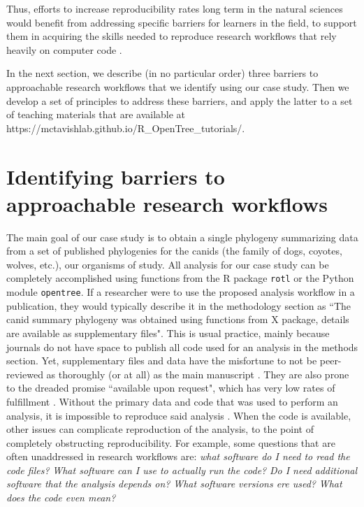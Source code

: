 \documentclass[12pt]{article}
\begin{document}
Thus, efforts to increase reproducibility rates long term in the natural sciences would benefit from addressing specific barriers for learners in the field, to support them in acquiring the skills needed to reproduce research workflows that rely heavily on computer code \citep{peng2011reproducible, sandve2013ten, powers2019open}.

In the next section, we describe (in no particular order) three barriers to approachable research workflows that we identify using our case study.
Then we develop a set of principles to address these barriers, and apply the latter to a set of teaching materials that are available at https://mctavishlab.github.io/R\_OpenTree\_tutorials/.


\section*{Identifying barriers to approachable research workflows}
\label{sec:identifying}


The main goal of our case study is to obtain a single phylogeny summarizing data from a set of published phylogenies for the canids (the family of dogs, coyotes, wolves, etc.), our organisms of study.
All analysis for our case study can be completely accomplished using functions from the R package \texttt{rotl} or the Python module \texttt{opentree}.
If a researcher were to use the proposed analysis workflow in a publication, they would typically describe it in the methodology section as ``The canid summary phylogeny was obtained using functions from X package, details are available as supplementary files".
This is usual practice, mainly because journals do not have space to publish all code used for an analysis in the methods section. Yet, supplementary files and data have the misfortune to not be peer-reviewed as thoroughly (or at all) as the main manuscript \citep{pop2015use}.
They are also prone to the dreaded promise ``available upon request", which has very low rates of fulfillment \citep{krawczyk2012available, gabelica2022many}.
Without the primary data and code that was used to perform an analysis, it is impossible to reproduce said analysis \citep{miyakawa2020no}. When the code is available, other issues can complicate reproduction of the analysis, to the point of completely obstructing reproducibility.
For example, some questions that are often unaddressed in research workflows are:
\textit{what software do I need to read the code files?}
\textit{What software can I use to actually run the code?}
\textit{Do I need additional software that the analysis depends on?}
\textit{What software versions ere used?}
\textit{What does the code even mean?}
\end{document}
